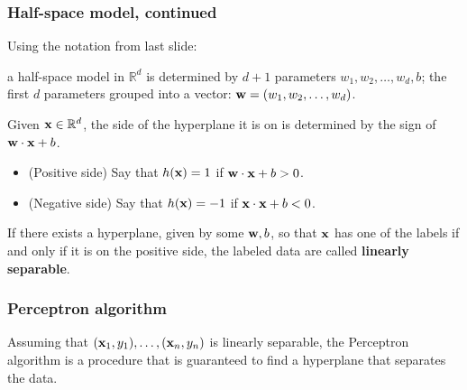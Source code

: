 \documentclass{beamer}
\theoremstyle{example}
\begin{document}
\begin{frame}
\frametitle{Half-space model, continued}
    Using the notation from last slide: 
    
    a half-space model in $\mathbb R^d$ is determined by $d+1$ parameters $w_1,w_2,\ldots,w_d,b$; the first $d$ parameters grouped into a vector: ${\bf w} = (w_1,w_2,\ldots,w_d)$.
    
    \pause
    Given ${\bf x}\in \mathbb R^d$, the side of the hyperplane it is on is determined by the sign of ${\bf w}\cdot{\bf x} + b$.
    \begin{itemize}
        \item (Positive side) Say that $h({\bf x}) = 1$ if ${\bf w}\cdot{\bf x}+b > 0$.
        \item (Negative side) Say that $h({\bf x}) = -1$ if ${\bf x}\cdot{\bf x}+b < 0$. 
    \end{itemize}

    \pause
    If there exists a hyperplane, given by some ${\bf w}, b$, so that ${\bf x}$ has one of the labels if and only if it is on the positive side, the labeled data are called \textbf{linearly separable}. 

\end{frame}

\begin{frame}
    \frametitle{Perceptron algorithm}
    Assuming that $({\bf x}_1, y_1), \ldots, ({\bf x}_n, y_n)$ is linearly separable, the Perceptron algorithm is a procedure that is guaranteed to find a hyperplane that separates the data.
    
    \pause
    
\end{frame}
\end{document}
